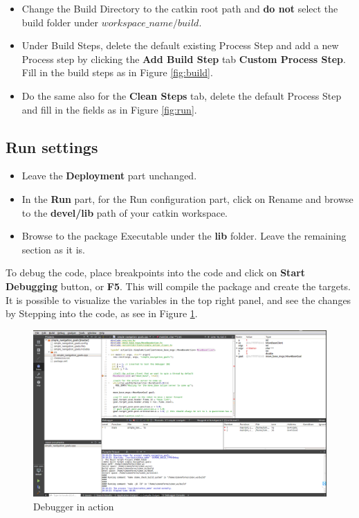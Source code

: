 \documentclass[11pt,a4paper]{article}
\begin{document}
\begin{itemize}
\item Change the Build Directory to the catkin root path and \textbf{do not} select the build folder under $workspace{\_}name/build$. 
\item Under Build Steps, delete the default existing Process Step and add a new Process step by clicking the \textbf{Add Build Step} tab \textrightarrow \textbf{Custom Process Step}. Fill in the build steps as in Figure \ref{fig:build}.
\item Do the same also for the \textbf{Clean Steps} tab, delete the default Process Step and fill in the fields as in Figure \ref{fig:run}.
\end{itemize}

\subsection{Run settings}

\begin{itemize}
\item Leave the \textbf{Deployment} part unchanged.
\item In the \textbf{Run} part, for the Run configuration part, click on Rename and browse to the \textbf{devel/lib} path of your catkin workspace.
\item Browse to the package Executable under the \textbf{lib} folder. Leave the remaining section as it is.
\end{itemize}

To debug the code, place breakpoints into the code and click on \textbf{Start Debugging} button, or \textbf{F5}. This will compile the package and create the targets. It is possible to visualize the variables in the top right panel, and see the changes by Stepping into the code, as see in Figure \ref{fig:overall}. 



\begin{figure}[!htb]
	\center
	\includegraphics[width=1.1\textwidth]{figures/big_window.png}
	\caption{Debugger in action}
	\label{fig:overall}
\end{figure}
\end{document}
